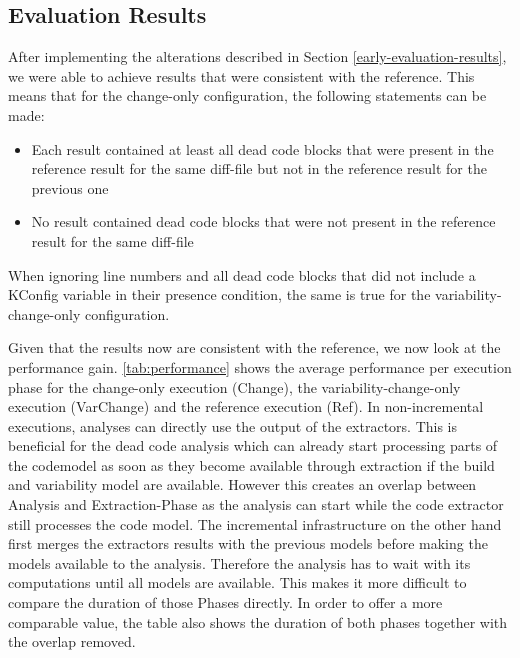 \documentclass[a4paper]{article}
\begin{document}
\subsection{Evaluation Results}

After implementing the alterations described in Section \ref{early-evaluation-results}, we were able to achieve results that were consistent with the reference. This means that for the change-only configuration, the following statements can be made:

\begin{itemize}
   \item Each result contained at least all dead code blocks that were present in the reference result for the same diff-file but not in the reference result for the previous one
   \item No result contained dead code blocks that were not present in the reference result for the same diff-file
\end{itemize}

When ignoring line numbers and all dead code blocks that did not include a KConfig variable in their presence condition, the same is true for the variability-change-only configuration. 

Given that the results now are consistent with the reference, we now look at the performance gain. \autoref{tab:performance} shows the average performance per execution phase for the change-only execution (Change), the variability-change-only execution (VarChange) and the reference execution (Ref). In non-incremental executions, analyses can directly use the output of the extractors. This is beneficial for the dead code analysis which can already start processing parts of the codemodel as soon as they become available through extraction if the build and variability model are available. However this creates an overlap between Analysis and Extraction-Phase as the analysis can start while the code extractor still processes the code model. The incremental infrastructure on the other hand first merges the extractors results with the previous models before making the models available to the analysis.  Therefore the analysis has to wait with its computations until all models are available. This makes it more difficult to compare the duration of those Phases directly. In order to offer a more comparable value, the table also shows the duration of both phases together with the overlap removed.
\end{document}
